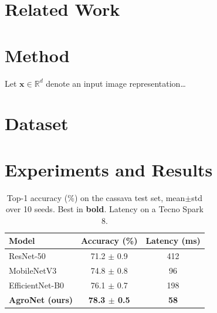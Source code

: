 \documentclass[11pt,a4paper]{article}
\newcommand{\x}{\bm{x}}          %
\newcommand{\R}{\mathbb{R}}
\newcommand{\model}{AgroNet}     %
\begin{document}
\section{Related Work}

\section{Method}\label{sec:method}
Let $\x \in \R^{d}$ denote an input image representation\ldots

\section{Dataset}\label{sec:data}

\section{Experiments and Results}\label{sec:results}

\begin{table}[t]
  \centering
  \caption{Top-1 accuracy (\%) on the cassava test set, mean$\pm$std
  over 10 seeds. Best in \textbf{bold}. Latency on a Tecno Spark 8.}
  \label{tab:main}
  \begin{tabular}{lcc}
    \toprule
    Model & Accuracy (\%) & Latency (ms) \\
    \midrule
    ResNet-50      & 71.2 $\pm$ 0.9 & 412 \\
    MobileNetV3    & 74.8 $\pm$ 0.8 & 96  \\
    EfficientNet-B0& 76.1 $\pm$ 0.7 & 198 \\
    \textbf{\model{} (ours)} & \textbf{78.3 $\pm$ 0.5} & \textbf{58} \\
    \bottomrule
  \end{tabular}
\end{table}
\end{document}
